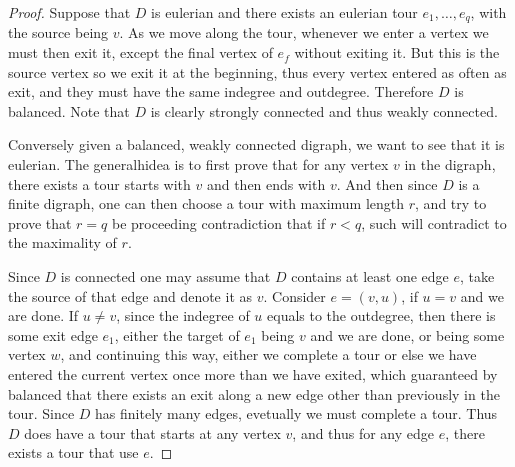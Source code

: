 \begin{proof}
	Suppose that \( D \) is eulerian and there exists an eulerian tour \( e_1, \ldots, e_q \), with
	the source being \( v \). As we move along the tour, whenever we enter a vertex we must then exit
	it, except the final vertex of \( e_f \) without exiting it. But this is the source vertex so we
	exit it at the beginning, thus every vertex entered as often as exit, and they must have the same
	indegree and outdegree. Therefore \( D \) is balanced. Note that \( D \) is clearly strongly
	connected and thus weakly connected.

	Conversely given a balanced, weakly connected digraph, we want to see that it is eulerian.
	The generalhidea is to first prove that for any vertex \( v \) in the digraph, there exists a tour
	starts with \( v \) and then ends with \( v \). And then since \( D \) is a finite digraph, one
	can then choose a tour with maximum length \( r \), and try to prove that \( r=q \) be proceeding
	contradiction that if \( r < q \), such will contradict to the maximality of \( r \).

	Since \( D \) is connected one may assume that \( D \) contains at least one edge \( e \), take
	the source of that edge and denote it as \( v \). Consider \( e = (v,u) \), if \( u = v\) and we
	are done. If \( u\ne v \), since the indegree of \( u \) equals to the outdegree, then there is
	some exit edge \( e_1 \), either the target of \( e_1 \) being \( v \) and we are done, or being
	some vertex \( w \), and continuing this way, either we complete a tour or else we have entered
	the current vertex once more than we have exited, which guaranteed by balanced that there exists
	an exit along a new edge other than previously in the tour. Since \( D \) has finitely many edges,
	evetually we must complete a tour. Thus \( D \) does have a tour that starts at any
	vertex \( v \), and thus for any edge \( e \), there exists a tour that use \( e \).


\end{proof}
